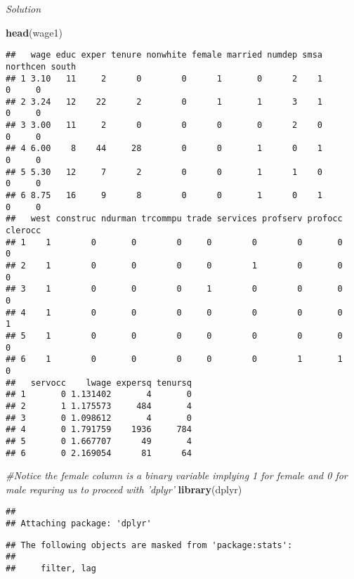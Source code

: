 \documentclass[
]{article}
\newenvironment{Shaded}{\begin{snugshade}}{\end{snugshade}}
\newcommand{\CommentTok}[1]{\textcolor[rgb]{0.56,0.35,0.01}{\textit{#1}}}
\newcommand{\KeywordTok}[1]{\textcolor[rgb]{0.13,0.29,0.53}{\textbf{#1}}}
\newcommand{\NormalTok}[1]{#1}
\begin{document}
\emph{Solution}

\begin{Shaded}
\begin{Highlighting}[]
\KeywordTok{head}\NormalTok{(wage1)}
\end{Highlighting}
\end{Shaded}

\begin{verbatim}
##   wage educ exper tenure nonwhite female married numdep smsa northcen south
## 1 3.10   11     2      0        0      1       0      2    1        0     0
## 2 3.24   12    22      2        0      1       1      3    1        0     0
## 3 3.00   11     2      0        0      0       0      2    0        0     0
## 4 6.00    8    44     28        0      0       1      0    1        0     0
## 5 5.30   12     7      2        0      0       1      1    0        0     0
## 6 8.75   16     9      8        0      0       1      0    1        0     0
##   west construc ndurman trcommpu trade services profserv profocc clerocc
## 1    1        0       0        0     0        0        0       0       0
## 2    1        0       0        0     0        1        0       0       0
## 3    1        0       0        0     1        0        0       0       0
## 4    1        0       0        0     0        0        0       0       1
## 5    1        0       0        0     0        0        0       0       0
## 6    1        0       0        0     0        0        1       1       0
##   servocc    lwage expersq tenursq
## 1       0 1.131402       4       0
## 2       1 1.175573     484       4
## 3       0 1.098612       4       0
## 4       0 1.791759    1936     784
## 5       0 1.667707      49       4
## 6       0 2.169054      81      64
\end{verbatim}

\begin{Shaded}
\begin{Highlighting}[]
\CommentTok{#Notice the female column is a binary variable implying 1 for female and 0 for male requring us to proceed with 'dplyr'}
\KeywordTok{library}\NormalTok{(dplyr)}
\end{Highlighting}
\end{Shaded}

\begin{verbatim}
## 
## Attaching package: 'dplyr'
\end{verbatim}

\begin{verbatim}
## The following objects are masked from 'package:stats':
## 
##     filter, lag
\end{verbatim}
\end{document}
